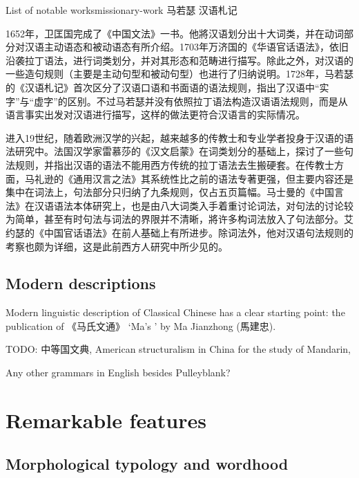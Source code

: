 \documentclass[UTF8, a4paper, oneside, scheme=plain, 12pt]{ctexrep}
\newcommand{\translate}[1]{`#1'}
\begin{document}
\begin{todobox}{List of notable works}{missionary-work}
    马若瑟 汉语札记

    1652年，卫匡国完成了《中国文法》一书。他將汉语划分出十大词类，并在动词部分对汉语主动语态和被动语态有所介绍。1703年万济国的《华语官话语法》，依旧沿袭拉丁语法，进行词类划分，并对其形态和范畴进行描写。除此之外，对汉语的一些造句规则（主要是主动句型和被动句型）也进行了归纳说明。1728年，马若瑟的《汉语札记》首次区分了汉语口语和书面语的语法规则，指出了汉语中“实字”与“虚字”的区别。不过马若瑟并没有依照拉丁语法构造汉语语法规则，而是从语言事实出发对汉语进行描写，这样的做法更符合汉语言的实际情况。

    进入19世纪，随着欧洲汉学的兴起，越来越多的传教士和专业学者投身于汉语的语法研究中。法国汉学家雷慕莎的《汉文启蒙》在词类划分的基础上，探讨了一些句法规则，并指出汉语的语法不能用西方传统的拉丁语法去生搬硬套。在传教士方面，马礼逊的《通用汉言之法》其系统性比之前的语法专著更强，但主要内容还是集中在词法上，句法部分只归纳了九条规则，仅占五页篇幅。马士曼的《中国言法》在汉语语法本体研究上，也是由八大词类入手着重讨论词法，对句法的讨论较为简单，甚至有时句法与词法的界限并不清晰，將许多构词法放入了句法部分。艾约瑟的《中国官话语法》在前人基础上有所进步。除词法外，他对汉语句法规则的考察也颇为详细，这是此前西方人研究中所少见的。
\end{todobox}

\subsection{Modern descriptions}\label{sec:introduction.previous.modern}

Modern linguistic description of Classical Chinese has a clear starting point:
the publication of 《马氏文通》 \translate{Ma's } by Ma Jianzhong (馬建忠).

TODO: 中等国文典, American structuralism in China for the study of Mandarin,

Any other grammars in English besides Pulleyblank?



\section{Remarkable features}


\subsection{Morphological typology and wordhood}
\end{document}
